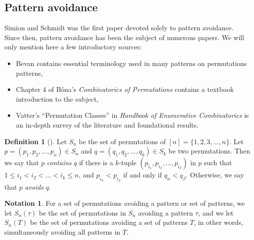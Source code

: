 \documentclass[
final
]{dmtcs-episciences}
\theoremstyle{definition}
\newtheorem{definition}[theorem]{Definition}
\newtheorem{notation}[theorem]{Notation}
\theoremstyle{remark}
\begin{document}
\subsection{Pattern avoidance}

Simion and Schmidt \cite{Simion} was the first paper devoted solely to pattern avoidance. Since then, pattern avoidance has been the subject of numerous papers. We will only mention here a few introductory sources:
\begin{itemize}

\item Bevan \cite{Bevan} contains essential terminology used in many patterns on permutations patterns,

\item  Chapter 4 of B\'ona's \emph{Combinatorics of Permutations} \cite{Bona} contains a textbook introduction to the subject, 

\item Vatter's ``Permutation Classes'' \cite{Vatter} in \emph{Handbook of Enumerative Combinatorics} is an in-depth survey of the literature and foundational results. 

\end{itemize}



\begin{definition}[\cite{Bona}]
\label{def:avoidance}
Let $S_n$ be the set of permutations of $[n] = \{1,2,3,...,n\}$. Let $p=(p_1,p_2,...,p_n)\in S_n$ and $q=(q_1,q_2,...,q_k)\in S_k$ be two permutations.  Then we say that $p$ \emph{contains} $q$ if there is a $k$-tuple $(p_{i_1},p_{i_2},\dots,p_{i_k})$ in $p$ such that $1\le i_1<i_2<\dots<i_k\le n$, and $p_{i_\alpha}<p_{i_\beta}$ if and only if $q_\alpha<q_\beta$.  Otherwise, we say that $p$ \emph{avoids} $q$.  
\end{definition}

\begin{notation}
For a set of permutations avoiding a pattern or set of patterns, we let $S_n(\tau)$ be the set of permutations in $S_n$ avoiding a pattern $\tau$, and we let $S_n(T)$ be the set of permutations avoiding a set of patterns $T$, in other words, simultaneously avoiding all patterns in $T$.
\end{notation}
\end{document}
